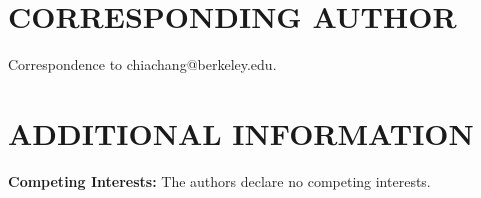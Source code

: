 \documentclass[prd,twocolumn,tightenlines,preprintnumbers,showpacs,superscriptaddress,notitlepage,nofootinbib,eqsecnum,floatfix,longbibliography,aps,10pt]{revtex4-1}
\begin{document}
\section{CORRESPONDING AUTHOR}
Correspondence to chiachang@berkeley.edu.

\section{ADDITIONAL INFORMATION}

\textbf{Competing Interests:} The authors declare no competing interests.



\end{document}
